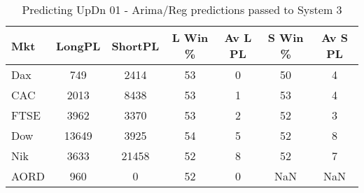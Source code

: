 \begin{table}[ht]
\centering
\caption[Predicting UpDn 01 - Arima/Reg predictions passed to System 3.]{Predicting UpDn 01 - Arima/Reg predictions passed to System 3} 
\label{tab:chp_ts:01_arima_reg_sys}
\begin{tabular}{lcccccc}
  \toprule Mkt & LongPL & ShortPL & L Win \% & Av L PL & S Win \% & Av S PL \\ 
  \midrule Dax & 749 & 2414 & 53 & 0 & 50 & 4 \\ 
  CAC & 2013 & 8438 & 53 & 1 & 53 & 4 \\ 
  FTSE & 3962 & 3370 & 53 & 2 & 52 & 3 \\ 
  Dow & 13649 & 3925 & 54 & 5 & 52 & 8 \\ 
  Nik & 3633 & 21458 & 52 & 8 & 52 & 7 \\ 
  AORD & 960 & 0 & 52 & 0 & NaN & NaN \\ 
   \bottomrule \end{tabular}
\end{table}
